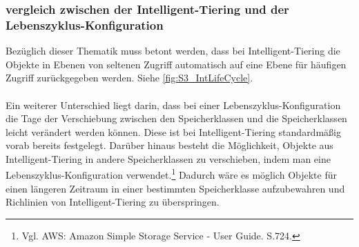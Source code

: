 \subsubsection*{vergleich zwischen der Intelligent-Tiering und der Lebenszyklus-Konfiguration}%
Bezüglich dieser Thematik muss betont werden, dass bei Intelligent-Tiering die Objekte in Ebenen von seltenen Zugriff automatisch auf eine Ebene für häufigen Zugriff zurückgegeben werden. Siehe \autoref{fig:S3_IntLifeCycle}.
\\\\
Ein weiterer Unterschied liegt darin, dass bei einer Lebenszyklus-Konfiguration die Tage der Verschiebung zwischen den Speicherklassen und die Speicherklassen leicht verändert werden können. Diese ist bei Intelligent-Tiering standardmäßig vorab bereits festgelegt. %
Darüber hinaus besteht die Möglichkeit, Objekte aus Intelligent-Tiering in andere Speicherklassen zu verschieben, %
indem man eine Lebenszyklus-Konfiguration verwendet.\footnote{Vgl. AWS: Amazon Simple Storage Service - User Guide. S.724.\cite{AMZ18}} %
Dadurch wäre es möglich Objekte für einen längeren Zeitraum in einer bestimmten Speicherklasse aufzubewahren und Richlinien von Intelligent-Tiering zu überspringen.

